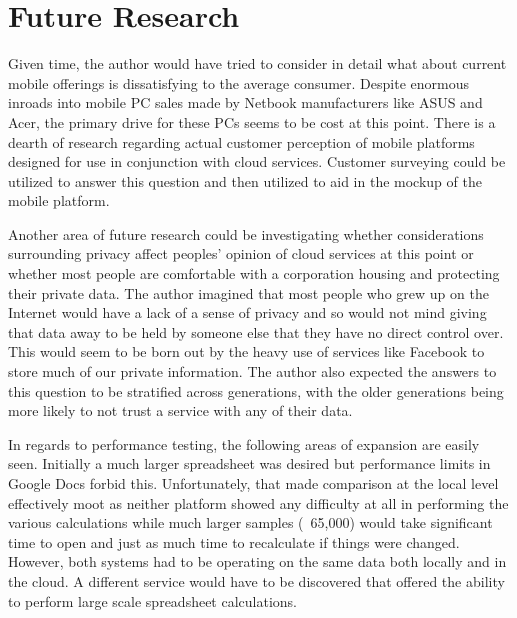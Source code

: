 \section{Future Research}



Given time, the author would have tried to consider in detail what about current
mobile offerings is dissatisfying to the average consumer.  Despite enormous
inroads into mobile PC sales made by Netbook manufacturers like ASUS and Acer,
the primary drive for these PCs seems to be cost at this
point\citep{gladstone09}.  There is a dearth of research regarding actual
customer perception of mobile platforms designed for use in conjunction with
cloud services.  Customer surveying could be utilized to answer this question
and then utilized to aid in the mockup of the mobile platform.

Another area of future research could be investigating whether considerations
surrounding privacy affect peoples' opinion of cloud services at this point or
whether most people are comfortable with a corporation housing and protecting
their private data.  The author imagined that most people who grew up on the
Internet would have a lack of a sense of privacy and so would not mind giving
that data away to be held by someone else that they have no direct control over.
This would seem to be born out by the heavy use of services like Facebook to
store much of our private information.  The author also expected the answers to
this question to be stratified across generations, with the older generations
being more likely to not trust a service with any of their data.


In regards to performance testing, the following areas of expansion are easily
seen.  Initially a much larger spreadsheet was desired but performance limits in
Google Docs forbid this.  Unfortunately, that made comparison at the local level
effectively moot as neither platform showed any difficulty at all in performing
the various calculations while much larger samples (~65,000) would take
significant time to open and just as much time to recalculate if things were
changed.  However, both systems had to be operating on the same data both
locally and in the cloud.  A different service would have to be discovered that
offered the ability to perform large scale spreadsheet calculations.
